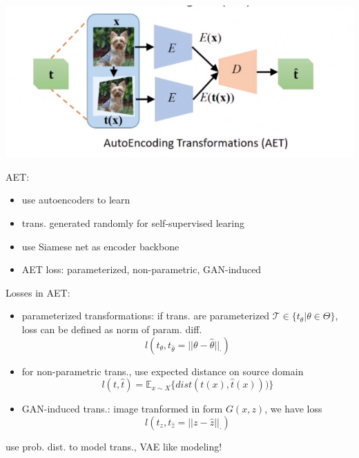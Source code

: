 \documentclass{article}
\begin{document}
    \centerline{\includegraphics[width=0.8\paperwidth]{aet.PNG}}
    AET:\begin{itemize}
        \item use autoencoders to learn 
        \item trans. generated randomly for self-supervised learing
        \item use Siamese net as encoder backbone
        \item AET loss: parameterized, non-parametric, GAN-induced
    \end{itemize}
    Losses in AET:
    \begin{itemize}
        \item parameterized transformations: if trans. are parameterized $\mathcal T \in \{t_\theta | \theta \in \Theta\}$, loss can be defined as norm of param. diff. 
        $$l(t_\theta, t_{\hat \theta}=||\theta - \hat \theta||_{\cdot})$$
        \item for non-parametric trans., use expected distance on source domain 
        $$l(t, \hat t)=\mathbb E_{x\sim X}\{dist(t(x), \hat t(x)))\}$$
        \item GAN-induced trans.: image tranformed in form $G(x, z)$, we have loss 
        $$l(t_z, t_{\hat z}=||z-\hat z||_\cdot)$$
    \end{itemize}

     use prob. dist. to model trans., VAE like modeling!
    
\end{document}
